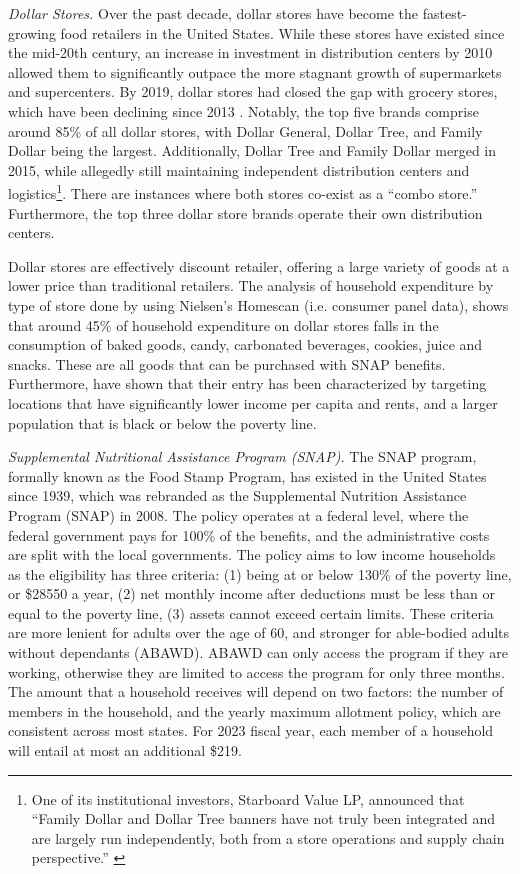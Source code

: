 \documentclass[11.5pt]{article}
\begin{document}
\textit{Dollar Stores.} Over the past decade, dollar stores have become the fastest-growing food retailers in the United States. While these stores have existed since the mid-20th century, an increase in investment in distribution centers by 2010 allowed them to significantly outpace the more stagnant growth of supermarkets and supercenters. By 2019, dollar stores had closed the gap with grocery stores, which have been declining since 2013 \cite{caoui2022impact}. Notably, the top five brands comprise around 85\% of all dollar stores, with Dollar General, Dollar Tree, and Family Dollar being the largest. Additionally, Dollar Tree and Family Dollar merged in 2015, while allegedly still maintaining independent distribution centers and logistics\footnote{One of its institutional investors, Starboard Value LP, announced that ``Family Dollar and Dollar Tree banners have not truly been integrated and are largely run independently, both from a store operations and supply chain perspective.'' \cite{spglobal2024}}. There are instances where both stores co-exist as a ``combo store.'' Furthermore, the top three dollar store brands operate their own distribution centers.


Dollar stores are effectively discount retailer, offering a large variety of goods at a lower price than traditional retailers. The analysis of household expenditure by type of store done by \citeauthor{schneier2023buck} \citeyear{schneier2023buck} using Nielsen's Homescan (i.e. consumer panel data), shows that around 45\% of household expenditure on dollar stores falls in the consumption of baked goods, candy, carbonated beverages, cookies, juice and snacks. These are all goods that can be purchased with SNAP benefits. Furthermore, \citeauthor{caoui2022impact} \citeyear{caoui2022impact} have shown that their entry has been characterized by targeting locations that have significantly lower income per capita and rents, and a larger population that is black or below the poverty line. 



\textit{Supplemental Nutritional Assistance Program (SNAP).} The SNAP program, formally known as the Food Stamp Program, has existed in the United States since 1939, which was rebranded as the Supplemental Nutrition Assistance Program (SNAP) in 2008. The policy operates at a federal level, where the federal government pays for 100\% of the benefits, and the administrative costs are split with the local governments. The policy aims to low income households as the eligibility  has three criteria: (1) being at or below 130\% of the poverty line, or \$28550 a year, (2) net monthly income after deductions must be less than or equal to the poverty line, (3) assets cannot exceed certain limits. These criteria are more lenient for adults over the age of 60, and stronger for able-bodied adults without dependants (ABAWD). ABAWD can only access the program if they are working, otherwise they are limited to access the program for only three months. The amount that a household receives will depend on two factors: the number of members in the household, and the yearly maximum allotment policy, which are consistent across most states. For 2023 fiscal year, each member of a household will entail at most an additional \$219. 
\end{document}

